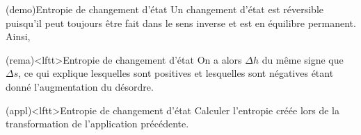 \documentclass[../../main/main.tex]{subfiles}
\begin{document}
\begin{tcb*}(demo){Entropie de changement d'état}
	Un changement d'état est réversible puisqu'il peut toujours être fait dans le
	sens inverse et est en équilibre permanent. Ainsi,
	\vspace{-15pt}
\end{tcb*}

\begin{tcb}(rema)<lftt>{Entropie de changement d'état}
	On a alors $\Delta{h}$ du même signe que $\Delta{s}$, ce qui explique
	lesquelles sont positives et lesquelles sont négatives étant donné
	l'augmentation du désordre.
\end{tcb}

\begin{tcb*}(appl)<lftt>{Entropie de changement d'état}
	Calculer l'entropie créée lors de la transformation de l'application
	précédente.
	\tcblower
	\vspace{-15pt}
	\vspace{-25pt}
\end{tcb*}
\end{document}
